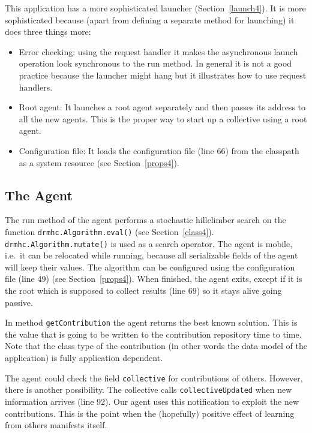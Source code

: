 \documentclass{article}
\begin{document}
This application has a more sophisticated launcher (Section~\ref{launch4}).
It is more sophisticated because (apart from defining a separate method
for launching) it does three things more:

\begin{itemize}
\item Error checking: using the request handler it makes the asynchronous
launch operation look synchronous to the run method.
In general it is not a good practice because the launcher might hang but
it illustrates how to use request handlers.
\item Root agent: It launches a root agent separately and then passes
its address to all the new agents.
This is the proper way to start up a collective using a root agent.
\item Configuration file: It loads the configuration file (line 66) from
the classpath as a system resource (see Section~\ref{props4}).
\end{itemize}

\subsection{The Agent}

The run method of the agent performs a stochastic hillclimber search on the
function {\tt drmhc.Algorithm.eval()} (see Section~\ref{class4}).
{\tt drmhc.Algorithm.mutate()} is used as a search operator.
The agent is mobile, i.e.\ it can be relocated while running, because all
serializable fields of the agent will keep their values.
The algorithm can be configured using the configuration file (line 49)
(see Section~\ref{props4}).
When finished, the agent exits, except if it is the root which is supposed
to collect results (line 69) so it stays alive going passive.

In method {\tt getContribution} the agent returns the best known solution.
This is the value that is going to be written to the contribution repository
time to time.
Note that the class type of the contribution (in other words the data model
of the application) is fully application dependent.

The agent could check the field {\tt collective} for contributions of others.
However, there is another possibility.
The collective calls {\tt collectiveUpdated} when new information
arrives (line 92).
Our agent uses this notification to exploit the new contributions.
This is the point when the (hopefully) positive effect of learning from
others manifests itself.
\end{document}
